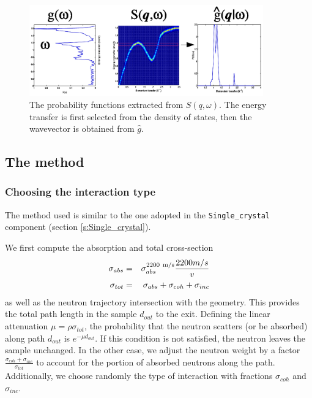 \begin{figure}
  \begin{center}
    \includegraphics[width=0.9\textwidth]{figures/Sqw_sampling.eps}
  \end{center}
\caption{The probability functions extracted from $S(q,\omega)$. The energy transfer is first selected from the density of states, then the wavevector is obtained from $\hat g$.}
\label{f:isotropic-sqw}
\end{figure}


\subsection{The method}

\subsubsection{Choosing the interaction type}

The method used is similar to the one adopted in the \verb+Single_crystal+ component (section \ref{s:Single_crystal}).

We first compute the absorption and total cross-section
\begin{eqnarray}
\sigma_{abs} &=& \sigma_{abs}^{{\rm 2200~m/s}}\frac{2200 m/s}{v} \\
\sigma_{tot} &=& \sigma_{abs} + \sigma_{coh} + \sigma_{inc}
\end{eqnarray}
as well as the neutron trajectory intersection with the geometry. This provides the total path length in the sample $d_{out}$ to the exit.
Defining the linear attenuation $\mu = \rho\sigma_{tot}$, the probability that the neutron scatters (or be absorbed) along path $d_{out}$ is $e^{-\mu d_{out}}$. If this condition is not satisfied, the neutron leaves the sample unchanged.
In the other case, we adjust the neutron weight by a factor $\frac{\sigma_{coh} + \sigma_{inc}}{\sigma_{tot}}$ to account for the portion of absorbed neutrons along the path.
Additionally, we choose randomly the type of interaction with fractions $\sigma_{coh}$ and $\sigma_{inc}$.

